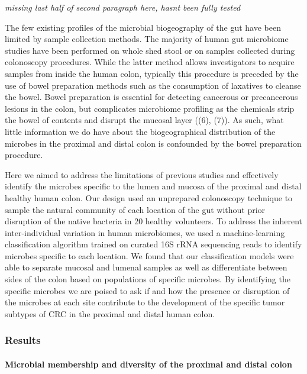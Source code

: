 \documentclass[11pt,]{article}
\let\oldparagraph\paragraph
\renewcommand{\paragraph}[1]{\oldparagraph{#1}\mbox{}}
\begin{document}
\emph{missing last half of second paragraph here, hasnt been fully
tested}

The few existing profiles of the microbial biogeography of the gut have
been limited by sample collection methods. The majority of human gut
microbiome studies have been performed on whole shed stool or on samples
collected during colonoscopy procedures. While the latter method allows
investigators to acquire samples from inside the human colon, typically
this procedure is preceded by the use of bowel preparation methods such
as the consumption of laxatives to cleanse the bowel. Bowel preparation
is essential for detecting cancerous or precancerous lesions in the
colon, but complicates microbiome profiling as the chemicals strip the
bowel of contents and disrupt the mucosal layer ((6), (7)). As such,
what little information we do have about the biogeographical
distribution of the microbes in the proximal and distal colon is
confounded by the bowel preparation procedure.

Here we aimed to address the limitations of previous studies and
effectively identify the microbes specific to the lumen and mucosa of
the proximal and distal healthy human colon. Our design used an
unprepared colonoscopy technique to sample the natural community of each
location of the gut without prior disruption of the native bacteria in
20 healthy volunteers. To address the inherent inter-individual
variation in human microbiomes, we used a machine-learning
classification algorithm trained on curated 16S rRNA sequencing reads to
identify microbes specific to each location. We found that our
classification models were able to separate mucosal and lumenal samples
as well as differentiate between sides of the colon based on populations
of specific microbes. By identifying the specific microbes we are poised
to ask if and how the presence or disruption of the microbes at each
site contribute to the development of the specific tumor subtypes of CRC
in the proximal and distal human colon.

\subsubsection{Results}\label{results}

\paragraph{Microbial membership and diversity of the proximal and distal
colon}\label{microbial-membership-and-diversity-of-the-proximal-and-distal-colon}
\end{document}
